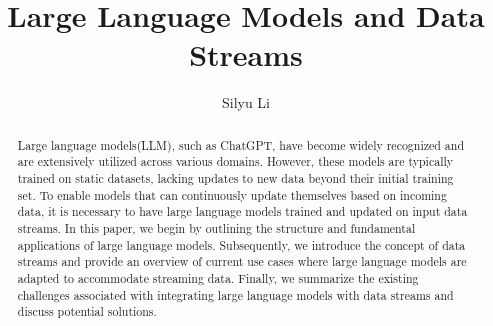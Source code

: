 \documentclass[runningheads]{llncs}
\begin{document}
%
%
%
\title{Large Language Models and Data Streams}
%
%
\author{Silyu Li}
%
%
%
\maketitle              %
%
\begin{abstract} 
Large language models(LLM), such as ChatGPT, have become widely recognized and are extensively utilized across various domains. 
However, these models are typically trained on static datasets, lacking updates to new data beyond their initial training set. 
To enable models that can continuously update themselves based on incoming data, it is necessary to have large language models trained and updated on input data streams.
In this paper, we begin by outlining the structure and fundamental applications of large language models. 
Subsequently, we introduce the concept of data streams and provide an overview of current use cases where large language models are adapted to accommodate streaming data. 
Finally, we summarize the existing challenges associated with integrating large language models with data streams and discuss potential solutions.
\end{abstract}


%

%
%
\end{document}
